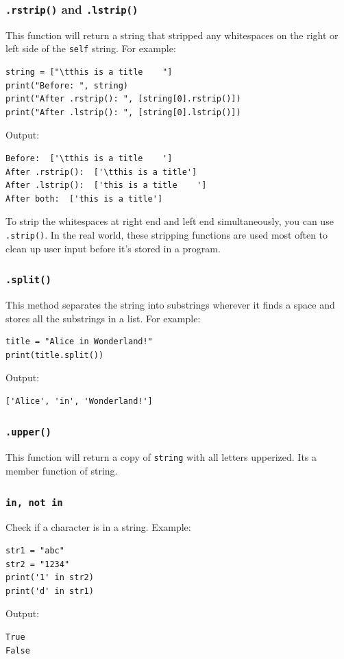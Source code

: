 \documentclass[12pt]{book}
\begin{document}
\subsubsection{\texttt{.rstrip()} and \texttt{.lstrip()}}
\label{sec:org87e9b62}
This function will return a string that stripped any whitespaces on the right or left side of the \texttt{self} string. For example:
\begin{verbatim}
string = ["\tthis is a title    "]
print("Before: ", string)
print("After .rstrip(): ", [string[0].rstrip()])
print("After .lstrip(): ", [string[0].lstrip()])
\end{verbatim}
Output:
\begin{verbatim}
Before:  ['\tthis is a title    ']
After .rstrip():  ['\tthis is a title']
After .lstrip():  ['this is a title    ']
After both:  ['this is a title']
\end{verbatim}

To strip the whitespaces at right end and left end simultaneously, you can use \texttt{.strip()}. In the real world, these stripping functions are used most often to clean up user input before it’s stored in a program.
\subsubsection{\texttt{.split()}}
\label{sec:org34c4bad}
This method separates the string into substrings wherever it finds a space and stores all the substrings in a list. For example:
\begin{verbatim}
title = "Alice in Wonderland!"
print(title.split())
\end{verbatim}
Output:
\begin{verbatim}
['Alice', 'in', 'Wonderland!']
\end{verbatim}

\subsubsection{\texttt{.upper()}}
\label{sec:org2c6cbfd}
This function will return a copy of \texttt{string} with all letters upperized. Its a member function of string.

\subsubsection{\texttt{in, not in}}
\label{sec:orga77175c}
Check if a character is in a string. Example:
\begin{verbatim}
str1 = "abc"
str2 = "1234"
print('1' in str2)
print('d' in str1)
\end{verbatim}
Output:
\begin{verbatim}
True
False
\end{verbatim}
\end{document}
